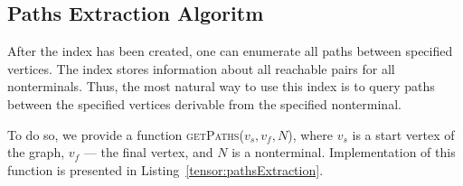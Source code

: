 \subsection{Paths Extraction Algoritm}

After the index has been created, one can enumerate all paths between specified vertices.
The index stores information about all reachable pairs for all nonterminals.
Thus, the most natural way to use this index is to query paths between the specified vertices derivable from the specified nonterminal.

To do so, we provide a function \textsc{getPaths}($v_s, v_f, N$), where $v_s$ is a start vertex of the graph, $v_f$ --- the final vertex, and $N$ is a nonterminal.
Implementation of this function is presented in Listing~\ref{tensor:pathsExtraction}.

